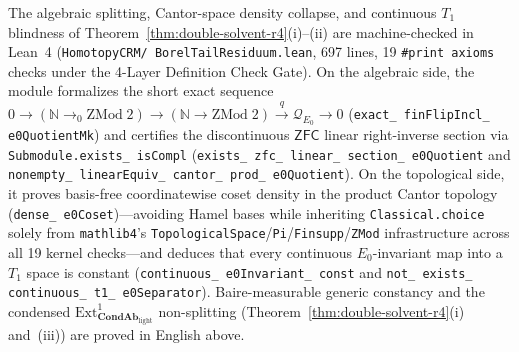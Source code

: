 The algebraic splitting, Cantor-space density collapse, and continuous $T_1$ blindness of Theorem~\ref{thm:double-solvent-r4}(i)--(ii) are machine-checked in Lean~4 (\texttt{HomotopyCRM/ BorelTailResiduum.lean}, 697 lines, 19 \texttt{\#print axioms} checks under the 4-Layer Definition Check Gate). On the algebraic side, the module formalizes the short exact sequence $0 \to (\mathbb{N} \to_0 \mathrm{ZMod}\;2) \to (\mathbb{N} \to \mathrm{ZMod}\;2) \xrightarrow{q} \mathcal{Q}_{E_0} \to 0$ (\texttt{exact\_ finFlipIncl\_ e0QuotientMk}) and certifies the discontinuous $\mathsf{ZFC}$ linear right-inverse section via \texttt{Submodule.exists\_ isCompl} (\texttt{exists\_ zfc\_ linear\_ section\_ e0Quotient} and \texttt{nonempty\_ linearEquiv\_ cantor\_ prod\_ e0Quotient}). On the topological side, it proves basis-free coordinatewise coset density in the product Cantor topology (\texttt{dense\_ e0Coset})---avoiding Hamel bases while inheriting \texttt{Classical.choice} solely from \texttt{mathlib4}'s \texttt{TopologicalSpace}/\texttt{Pi}/\texttt{Finsupp}/\texttt{ZMod} infrastructure across all 19 kernel checks---and deduces that every continuous $E_0$-invariant map into a $T_1$ space is constant (\texttt{continuous\_ e0Invariant\_ const} and \texttt{not\_ exists\_ continuous\_ t1\_ e0Separator}). Baire-measurable generic constancy and the condensed $\mathrm{Ext}^1_{\mathbf{CondAb}_{\mathrm{light}}}$ non-splitting (Theorem~\ref{thm:double-solvent-r4}(i) and~(iii)) are proved in English above.

